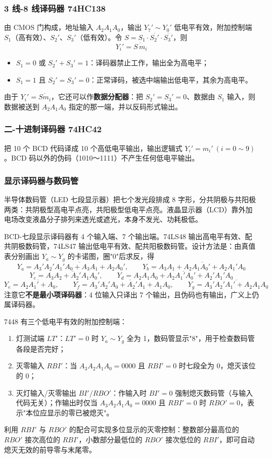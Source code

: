 \subsubsection{3 线-8 线译码器 74HC138}
由 CMOS 门构成，地址输入 \(A_2A_1A_0\)，输出 \(Y_7'\sim Y_0'\) 低电平有效，附加控制端 \(S_1\)（高有效）、\(S_2'\)、\(S_3'\)（低有效）。令 \(S=S_1\cdot\overline{S_2'}\cdot\overline{S_3'}\)，则
\[
Y_i'=\overline{S\,m_i}
\]
\begin{itemize}
    \item \(S_1=0\) 或 \(S_2'+S_3'=1\)：译码器禁止工作，输出全为高电平；
    \item \(S_1=1\) 且 \(S_2'=S_3'=0\)：正常译码，被选中端输出低电平，其余为高电平。
\end{itemize}
由于 \(Y_i'=\overline{S m_i}\)，它还可以作\textbf{数据分配器}：把 \(S_2'=S_3'=0\)、数据由 \(S_1\) 输入，则数据被送到 \(A_2A_1A_0\) 指定的那一端，并以反码形式输出。

\subsubsection{二-十进制译码器 74HC42}
把 10 个 BCD 代码译成 10 个高低电平输出，输出逻辑式 \(Y_i'=m_i'\ (i=0\sim9)\)。BCD 码以外的伪码（1010～1111）不产生任何低电平输出。

\subsubsection{显示译码器与数码管}
半导体数码管（LED 七段显示器）把七个发光段排成 8 字形，分共阴极与共阳极两类：共阴极型高电平点亮，共阳极型低电平点亮。液晶显示器（LCD）靠外加电场改变液晶分子排列来透光或遮光，本身不发光、功耗极低。

BCD-七段显示译码器有 4 个输入端、7 个输出端。74LS48 输出高电平有效、配共阴极数码管，74LS47 输出低电平有效、配共阳极数码管。设计方法是：由真值表分别画出 \(Y_a\sim Y_g\) 的卡诺图，圈"0"后求反，得
\[
Y_a=\overline{A_3'A_2'A_1'A_0+A_3A_1+A_2A_0'},\qquad
Y_b=\overline{A_3A_1+A_2A_1A_0'+A_2A_1'A_0}
\]
\[
Y_c=\overline{A_3A_2+A_2'A_1A_0'},\qquad
Y_d=\overline{A_2A_1A_0+A_2A_1'A_0'+A_2'A_1'A_0}
\]
\[
Y_e=\overline{A_2A_1'+A_0},\qquad
Y_f=\overline{A_3'A_2'A_0+A_2'A_1+A_1A_0},\qquad
Y_g=\overline{A_3'A_2'A_1'+A_2A_1A_0}
\]
注意它\textbf{不是最小项译码器}：4 位输入只译出 7 个输出，且伪码也有输出，广义上仍属译码器。

7448 有三个低电平有效的附加控制端：
\begin{enumerate}
    \item 灯测试端 \(LT'\)：\(LT'=0\) 时 \(Y_a\sim Y_g\) 全为 1，数码管显示"8"，用于检查数码管各段是否完好；
    \item 灭零输入 \(RBI'\)：当 \(A_3A_2A_1A_0=0000\) 且 \(RBI'=0\) 时七段全为 0，熄灭该位的 0；
    \item 灭灯输入/灭零输出 \(BI'/RBO'\)：作输入时 \(BI'=0\) 强制熄灭数码管（与输入代码无关）；作输出时仅当 \(A_3A_2A_1A_0=0000\) 且 \(RBI'=0\) 时 \(RBO'=0\)，表示"本位应显示的零已被熄灭"。
\end{enumerate}
利用 \(RBI'\) 与 \(RBO'\) 的配合可实现多位显示的灭零控制：整数部分最高位的 \(RBO'\) 接次高位的 \(RBI'\)，小数部分最低位的 \(RBO'\) 接次低位的 \(RBI'\)，即可自动熄灭无效的前导零与末尾零。

